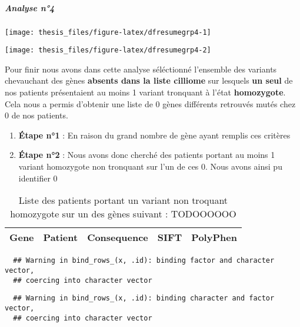 \documentclass[12pt,twoside]{reedthesis}
\providecommand{\tightlist}{%
  \setlength{\itemsep}{0pt}\setlength{\parskip}{0pt}}
\theoremstyle{definition}
\theoremstyle{definition}
\theoremstyle{remark}
\begin{document}
  \newpage
  
  \subparagraph{Analyse n°4}\label{analyse-n4}
  
  \begin{center}\texttt{[image: thesis\_files/figure-latex/dfresumegrp4-1]} \end{center}
  
  \begin{center}\texttt{[image: thesis\_files/figure-latex/dfresumegrp4-2]} \end{center}
  
  \newpage
  
  Pour finir nous avons dans cette analyse séléctionné l'ensemble des
  variants chevauchant des gènes \textbf{absents dans la liste cilliome}
  sur lesquels \textbf{un seul} de nos patients présentaient au moins 1
  variant tronquant à l'état \textbf{homozygote}. Cela nous a permis
  d'obtenir une liste de 0 gènes différents retrouvés mutés chez 0 de nos
  patients.
  
  \begin{enumerate}
  \def\labelenumi{\arabic{enumi}.}
  \tightlist
  \item
    \textbf{Étape n°1} : En raison du grand nombre de gène ayant remplis
    ces critères\\
  \item
    \textbf{Étape n°2} : Nous avons donc cherché des patients portant au
    moins 1 variant homozygote non tronquant sur l'un de ces 0. Nous avons
    ainsi pu identifier 0
  \end{enumerate}
  
  \newpage
  
  \begin{longtable}[t]{lllll}
  \caption{\label{tab:tabgrp4moderate}Liste des patients portant un variant non troquant homozygote sur un des gènes suivant : TODOOOOOO}\\
  \toprule
  Gene & Patient & Consequence & SIFT & PolyPhen\\
  
  
  \bottomrule
  \end{longtable}
  
  \begin{verbatim}
  ## Warning in bind_rows_(x, .id): binding factor and character vector,
  ## coercing into character vector
  \end{verbatim}
  
  \begin{verbatim}
  ## Warning in bind_rows_(x, .id): binding character and factor vector,
  ## coercing into character vector
  \end{verbatim}
  
\end{document}
